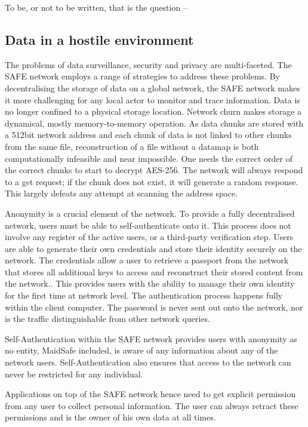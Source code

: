 \documentclass[twocolumn,english]{article}
\begin{document}
To be, or not to be written, that is the question --

\subsection{Data in a hostile environment}

The problems of data surveillance, security and privacy are multi-faceted. The SAFE network employs a range of strategies to address these problems. By decentralising the storage of data on a global network, the SAFE
network makes it more challenging for any local actor to monitor and trace information.  Data is no longer confined to a physical storage location.  Network churn makes storage a dynamical, mostly memory-to-memory operation.
As data chunks are stored with a 512bit network address and each chunk of data
is not linked to other chunks from the same file, reconstruction of a file without a datamap is both computationally infeasible and near impossible.  One needs the correct order of the correct chunks to start to decrypt AES-256.  The network will always respond to a get request; if the chunk does not exist, it will generate a random response. This largely defeats any attempt at scanning the address space.

Anonymity is a crucial element of the network. To provide a fully decentralised network, users must be able to self-authenticate onto it.  This process does not involve any register of the active users, or a third-party verification step.  Users are able to generate their own credentials and store their identity securely on the network. The credentials allow a user to retrieve a passport from the network that stores all additional keys to access and reconstruct their stored content from the network.\cite{msSA}. This provides users with the ability to manage their own
identity for the first time at network level.  The authentication process happens fully within the client computer. The password is never sent out onto the network, nor is the traffic distinguishable from other network queries.

Self-Authentication within the SAFE network provides users
with anonymity as no entity, MaidSafe included, is aware of any information
about any of the network users. Self-Authentication also ensures
that access to the network can never be restricted for any individual.

Applications on top of the SAFE network hence need to get explicit permission from any user to collect personal information.  The user can always retract these permissions and is the owner of his own data at all times.
\end{document}
